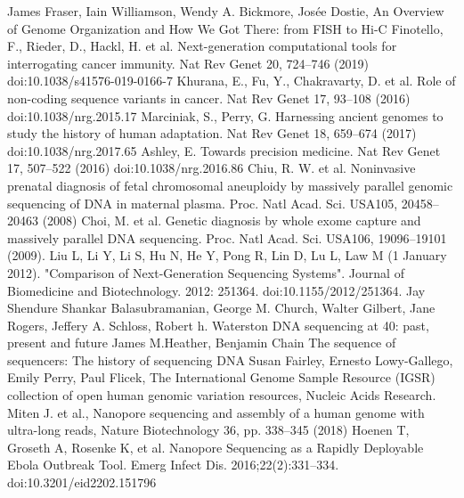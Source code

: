 \documentclass[a4paper,11pt,twoside]{report}
\theoremstyle{definition}
\begin{document}

\begin{thebibliography}{20}%
James Fraser, Iain Williamson, Wendy A. Bickmore,  Josée Dostie, An Overview of Genome Organization and How We Got There: from FISH to Hi-C
Finotello, F., Rieder, D., Hackl, H. et al. Next-generation computational tools for interrogating cancer immunity. Nat Rev Genet 20, 724–746 (2019) doi:10.1038/s41576-019-0166-7
Khurana, E., Fu, Y., Chakravarty, D. et al. Role of non-coding sequence variants in cancer. Nat Rev Genet 17, 93–108 (2016) doi:10.1038/nrg.2015.17
 Marciniak, S., Perry, G. Harnessing ancient genomes to study the history of human adaptation. Nat Rev Genet 18, 659–674 (2017) doi:10.1038/nrg.2017.65
 Ashley, E. Towards precision medicine. Nat Rev Genet 17, 507–522 (2016) doi:10.1038/nrg.2016.86
 Chiu, R. W. et al. Noninvasive prenatal diagnosis of fetal chromosomal aneuploidy by massively parallel genomic sequencing of DNA in maternal plasma. Proc. Natl Acad. Sci. USA105, 20458–20463 (2008)
 Choi, M. et al. Genetic diagnosis by whole exome capture and massively parallel DNA sequencing. Proc. Natl Acad. Sci. USA106, 19096–19101 (2009).
 Liu L, Li Y, Li S, Hu N, He Y, Pong R, Lin D, Lu L, Law M (1 January 2012). "Comparison of Next-Generation Sequencing Systems". Journal of Biomedicine and Biotechnology. 2012: 251364. doi:10.1155/2012/251364.
 Jay Shendure Shankar Balasubramanian, George M. Church, Walter Gilbert, Jane Rogers, Jeffery A. Schloss, Robert h. Waterston DNA sequencing at 40: past, present and future
 James M.Heather, Benjamin Chain The sequence of sequencers: The history of sequencing DNA
 Susan Fairley, Ernesto Lowy-Gallego, Emily Perry, Paul Flicek, The International Genome Sample Resource (IGSR) collection of open human genomic variation resources, Nucleic Acids Research.
 Miten J. et al., Nanopore sequencing and assembly of a human genome with ultra-long reads, Nature Biotechnology 36, pp. 338–345 (2018) 
 Hoenen T, Groseth A, Rosenke K, et al. Nanopore Sequencing as a Rapidly Deployable Ebola Outbreak Tool. Emerg Infect Dis. 2016;22(2):331–334. doi:10.3201/eid2202.151796

\end{thebibliography}
\end{document}
